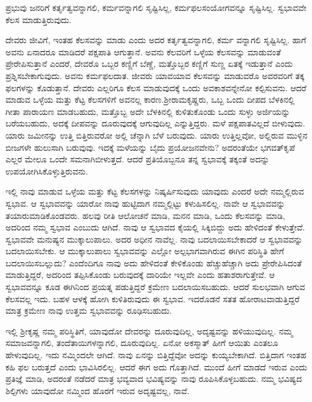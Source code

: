 \begin{artha}
ಪ್ರಭುವು ಜನರಿಗೆ ಕರ್ತೃತ್ವವನ್ನಾಗಲಿ, ಕರ್ಮವನ್ನಾಗಲಿ ಸೃಷ್ಟಿಸಿಲ್ಲ, ಕರ್ಮಫಲಸಂಯೋಗವನ್ನೂ ಸೃಷ್ಟಿಸಿಲ್ಲ. ಸ್ವಭಾವವೇ ಕೆಲಸ ಮಾಡುತ್ತಿರುವುದು.
\end{artha}

ದೇವರು ಜೀವಿಗೆ, ಇಂತಹ ಕೆಲಸವನ್ನು ಮಾಡು ಎಂದು ಅದರ ಕರ್ತೃತ್ವವನ್ನಾಗಲಿ, ಕರ್ಮ ವನ್ನಾಗಲಿ ಸೃಷ್ಟಿಸಿಲ್ಲ. ಹಾಗೆ ಅವನು ಏನಾದರೂ ಮಾಡಿದರೆ ಪಕ್ಷಪಾತಿ ಆಗುತ್ತಾನೆ. ಅವನು ಕೆಲವರಿಗೆ ಒಳ್ಳೆಯ ಕೆಲಸವನ್ನು ಮಾಡುವಂತೆ ಪ್ರೇರೇಪಿಸುತ್ತಾನೆ ಎಂದರೆ, ದೇವರೊ ಒಬ್ಬರ ಕಣ್ಣಿಗೆ ಬೆಣ್ಣೆ, ಮತ್ತೊಬ್ಬರ ಕಣ್ಣಿಗೆ ಸುಣ್ಣ ಏತಕ್ಕೆ ಇಡುತ್ತಾನೆ ಎಂದು ಪ್ರಶ್ನಿಸಬೇಕಾಗುವುದು. ಅವನು ಕರ್ಮಫಲದಾತ. ಜೀವರು ಯಾವಯಾವ ಕೆಲಸವನ್ನು ಮಾಡುವರೊ ಅವರವರಿಗೆ ತಕ್ಕ ಫಲಗಳನ್ನು ಕೊಡುತ್ತಾನೆ. ದೇವರು ಎಲ್ಲರಿಗೂ ಕೆಲಸ ಮಾಡುವುದಕ್ಕೆ ಒಂದು ಅವಕಾಶವನ್ನೇನೋ ಕಲ್ಪಿಸುವನು. ಆದರೆ ಮಾಡುವ ಒಳ್ಳೆಯ ಮತ್ತು ಕೆಟ್ಟ ಕೆಲಸಗಳಿಗೆ ಅವನಲ್ಲ ಕಾರಣ.\break ಶ‍್ರೀರಾಮಕೃಷ್ಣರು, ಒಬ್ಬ ಒಂದು ದೀಪದ ಬೆಳಕಿನಲ್ಲಿ ಗೀತಾ ಪಾರಾಯಣ ಮಾಡಬಹುದು, ಮತ್ತೊಬ್ಬ ಅದೇ ಬೆಳಕಿನಲ್ಲಿ ಕುಳಿತುಕೊಂಡು ಒಂದು ಸುಳ್ಳು ಅರ್ಜಿಯನ್ನು ಬರೆಯಬಹುದು, ಅದಕ್ಕೆ ದೀಪವನ್ನು ದೂರುವುದಕ್ಕೆ ಆಗುವುದಿಲ್ಲ ಎನ್ನುತ್ತಿದ್ದರು. ಮಳೆ ಪಕ್ಷಪಾತವಿಲ್ಲದೆ ಬೀಳುವುದು. ಯಾರು ಜಮೀನನ್ನು ಉತ್ತಿ ಬಿತ್ತಿರುವರೋ ಅಲ್ಲಿ ಚೆನ್ನಾಗಿ ಬೆಳೆ ಬರುವುದು. ಯಾರು ಉತ್ತಿಲ್ಲವೋ, ಅಲ್ಲಿರುವ ಮುಳ್ಳಿನ ಬೀಜಗಳೇ ಹುಲುಸಾಗಿ ಬರುವುವು. ಇದಕ್ಕೆ ಮಳೆಯನ್ನು ಬೈದು ಪ್ರಯೋಜನವೇನು? ಅದರಂತೆಯೇ ಭಗವತ್​ಕೃಪೆ ಎಲ್ಲರ ಮೇಲೂ ಒಂದೇ ಸಮನಾಗಿಬೀಳುತ್ತದೆ. ಆದರೆ ಪ್ರತಿಯೊಬ್ಬನೂ ತನ್ನ ಸ್ವಭಾವಕ್ಕೆ ತಕ್ಕಂತೆ ಅದನ್ನು ಉಪಯೋಗಿಸಿಕೊಳ್ಳುತ್ತಿರುವನು.

ಇಲ್ಲಿ ನಾವು ಮಾಡುವ ಒಳ್ಳೆಯ ಮತ್ತು ಕೆಟ್ಟ ಕೆಲಸಗಳನ್ನು ನಿಷ್ಕರ್ಷಿಸುವುದು ಯಾವುದು ಎಂದರೆ ಅದೇ ನಮ್ಮಲ್ಲಿರುವ ಸ್ವಭಾವ. ಆ ಸ್ವಭಾವವನ್ನು ಯಾರೋ ನಾವು ಹುಟ್ಟಿದಾಗ ನಮ್ಮಲ್ಲಿಟ್ಟು ಕಳುಹಿಸಲಿಲ್ಲ. ನಾವೇ ಆ ಸ್ವಭಾವವನ್ನು ತಯಾರುಮಾಡಿಕೊಂಡವರು. ಹಲವು ರೀತಿ ಆಲೋಚನೆ ಮಾಡಿ, ಮನನ ಮಾಡಿ, ಒಂದು ಕೆಲಸವನ್ನು ಮಾಡಿ, ಅದರಿಂದ ನಮ್ಮ ಸ್ವಭಾವ ಎಂಬುದು ಆಗಿದೆ. ನಾವು ಆ ಸ್ವಭಾವದ ಕೈಯಲ್ಲಿ ಸಿಕ್ಕಿಬಿದ್ದು ಅದು ಹೇಳಿದಂತೆ ಕೇಳುತ್ತೇವೆ. ಸ್ವಭಾವವೇ ಮನುಷ್ಯನ ಮುಕ್ಕಾಲುಪಾಲು. ಅದರ ಅಧೀನ ನಾವೆಲ್ಲ. ನಾವು ಬದಲಾಯಿಸಬೇಕಾದರೆ ಆ ಸ್ವಭಾವವನ್ನು ಬದಲಾಯಿಸಬೇಕು. ಆ ಮುಕ್ಕಾಲುಪಾಲು ಸ್ವಭಾವವನ್ನು ಎಲ್ಲೋ ಅಲ್ಪಭಾಗವಾಗಿರುವ ಈಗಿನ ಪರಿಸ್ಥಿತಿ ಹೇಗೆ ಬದಲಾಯಿಸಬಲ್ಲುದು? ಎಂದೆಂದಿಗೂ ನಾವು ಅದು ಹೇಳಿದಂತೆ ಕೇಳಿಕೊಂಡು ಹೆಚ್ಚುಹೆಚ್ಚಾಗಿ ಅದು ಪ್ರೇರೇಪಿಸಿದಂತೆ ಮಾಡುತ್ತಿದ್ದರೆ, ಅದರಿಂದ ತಪ್ಪಿಸಿಕೊಂಡು ಬರುವುದಕ್ಕೆ ದಾರಿಯೇ ಇಲ್ಲವೇ ಎಂದು ಹತಾಶರಾಗುತ್ತೇವೆ. ಆ ಸ್ವಭಾವವನ್ನೂ ಕೂಡ ಈಗಿನಿಂದ ಪ್ರಯತ್ನ ಪಡುತ್ತಿದ್ದರೆ ಕ್ರಮೇಣ ಬದಲಾಯಿಸಬಹುದು. ಆದರೆ ಸುಲಭವಾಗಿ ಆಗುವ ಕೆಲಸವಲ್ಲ ಇದು. ಬಹಳ ಆಳಕ್ಕೆ ಹೋಗಿ ಕುಳಿತಿರುವುದು ಈ ಸ್ವಭಾವ. ಇದರೊಡನೆ ಸತತ ಹೋರಾಟವಾಡುತ್ತಿದ್ದರೆ ಮಾತ್ರ ಕ್ರಮೇಣ ನಾವು ಉತ್ತಮ ಸ್ವಭಾವವನ್ನು ರೂಢಿಸಬಹುದು.

ಇಲ್ಲಿ ಶ‍್ರೀಕೃಷ್ಣ ನಮ್ಮ ಪರಿಸ್ಥಿತಿಗೆ, ಯಾವುದೋ ದೇವರನ್ನು ದೂರುವುದಿಲ್ಲ, ಅದೃಷ್ಟವನ್ನು ಹಳಿಯುವುದಿಲ್ಲ. ನಮ್ಮ ಸಮಾಜವನ್ನಾಗಲಿ, ತಂದೆತಾಯಿಗಳನ್ನಾಗಲಿ, ದೂರುವುದಿಲ್ಲ. ಏನೋ ಅಕಸ್ಮಾತ್ ಹೀಗೆ ಆಯಿತು ಎಂತಲೂ ಹೇಳುವುದಿಲ್ಲ. ಇದು ನಮ್ಮಿಂದಲೇ ಆಗಿದೆ. ನಾವು ಏನನ್ನು ಬಿತ್ತಿದ್ದೆವೋ ಅದನ್ನು ಕುಯ್ಯಬೇಕಾಗಿದೆ. ಬಿತ್ತಿದಾಗ ಇಂತಹ ಕಹಿ ಫಲ ಬರುತ್ತದೆ ಎಂದು ಭಾವಿಸಿರಲಿಲ್ಲ. ಆದರೆ ಈಗ ಅದು ಗೊತ್ತಾಗಿದೆ. ಮುಂದೆ ಹೀಗೆ ಮಾಡದೆ ಇರುವ ಎಂದು ಪ್ರತಿಜ್ಞೆ ಮಾಡಿ, ಅದರಂತೆ ನಡೆದರೆ ಮಾತ್ರ ಭವ್ಯವಾದ ಭವಿಷ್ಯವನ್ನು ನಾವು ರೂಪಿಸಿಕೊಳ್ಳಬಹುದು. ನಮ್ಮ ಭವಿಷ್ಯದ ಶಿಲ್ಪಿಗಳು ಯಾವುದೋ ನಮ್ಮಿಂದ ಹೊರಗೆ ಇರುವ ಅದೃಷ್ಟವಲ್ಲ, ನಾವೆ.

